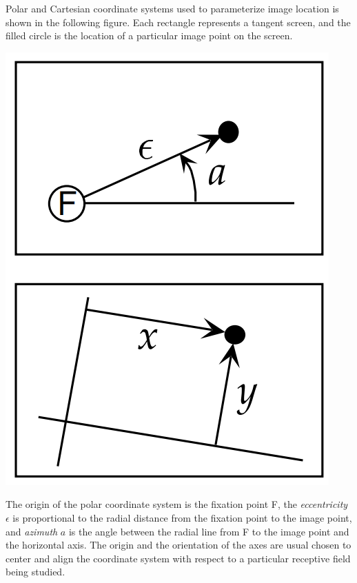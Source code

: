 \begin{ntn}
  \label{ntn:twoCoordinateSystems}
  Polar and Cartesian coordinate systems used to parameterize image location is shown in the following figure. Each rectangle represents a tangent screen, and the filled circle is the location of a particular image point on the screen.
  \begin{center}
    \includegraphics[scale=0.15]{./png/Coord}
  \end{center}
  The origin of the polar coordinate system is the fixation point F, the \emph{eccentricity} $\epsilon$ is proportional to the radial distance from the fixation point to the image point, and \emph{azimuth} $a$ is the angle between the radial line from F to the image point and the horizontal axis. The origin and the orientation of the axes are usual chosen to center and align the coordinate system with respect to a particular receptive field being studied.
\end{ntn}

 
 




